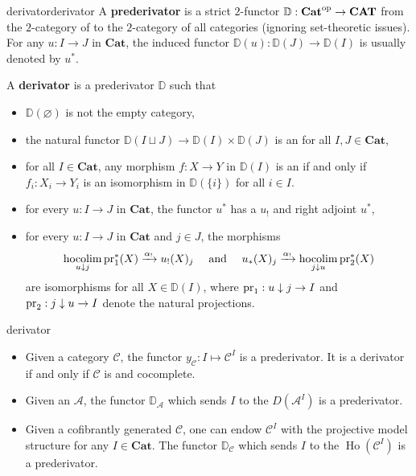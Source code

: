\begin{topic}{derivator}{derivator}
    A \textbf{prederivator} is a strict $2$-functor $\mathbb{D} : \textbf{Cat}^\textup{op} \to \textbf{CAT}$ from the $2$-category of  to the $2$-category of all categories (ignoring set-theoretic issues). For any $u : I \to J$ in $\textbf{Cat}$, the induced functor $\mathbb{D}(u) : \mathbb{D}(J) \to \mathbb{D}(I)$ is usually denoted by $u^*$.

    A \textbf{derivator} is a prederivator $\mathbb{D}$ such that
    \begin{itemize}
        \item $\mathbb{D}(\varnothing)$ is not the empty category,
        \item the natural functor $\mathbb{D}(I \sqcup J) \to \mathbb{D}(I) \times \mathbb{D}(J)$ is an  for all $I, J \in \textbf{Cat}$,
        \item for all $I \in \textbf{Cat}$, any morphism $f : X \to Y$ in $\mathbb{D}(I)$ is an  if and only if $f_i : X_i \to Y_i$ is an isomorphism in $\mathbb{D}(\{ i \})$ for all $i \in I$.
        \item for every $u : I \to J$ in $\textbf{Cat}$, the functor $u^*$ has a  $u_!$ and right adjoint $u^*$,
        \item for every $u : I \to J$ in $\textbf{Cat}$ and $j \in J$, the morphisms
        \[ \operatorname*{hocolim}_{u \downarrow j} \textup{pr}_1^*(X) \xrightarrow{\alpha_!} u_!(X)_j \quad \textup{ and } \quad u_*(X)_j \xrightarrow{\alpha_!} \operatorname*{hocolim}_{j \downarrow u} \textup{pr}_2^*(X) \]
        are isomorphisms for all $X \in \mathbb{D}(I)$, where $\textup{pr}_1 : u \downarrow j \to I$ and $\textup{pr}_2 : j \downarrow u \to I$ denote the natural projections.
    \end{itemize}
\end{topic}

\begin{example}{derivator}
    \begin{itemize}
        \item Given a category $\mathcal{C}$, the functor $y_\mathcal{C} : I \mapsto \mathcal{C}^I$ is a prederivator. It is a derivator if and only if $\mathcal{C}$ is  and cocomplete.
        \item Given an  $\mathcal{A}$, the functor $\mathbb{D}_\mathcal{A}$ which sends $I$ to the  $D(\mathcal{A}^I)$ is a prederivator.
        \item Given a cofibrantly generated  $\mathcal{C}$, one can endow $\mathcal{C}^I$ with the projective model structure for any $I \in \textbf{Cat}$. The functor $\mathbb{D}_\mathcal{C}$ which sends $I$ to the  $\operatorname{Ho}(\mathcal{C}^I)$ is a prederivator.
    \end{itemize}
\end{example}
